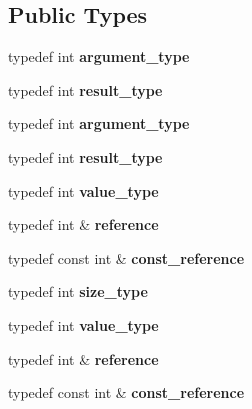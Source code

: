 \subsection*{Public Types}
\begin{DoxyCompactItemize}
\item 
\mbox{\label{struct_c_ae439ca18b80128cfa16466dcf34f3639}} 
typedef int {\bfseries argument\+\_\+type}
\item 
\mbox{\label{struct_c_ac97b3837e6e119e4d9586ec32c739c7b}} 
typedef int {\bfseries result\+\_\+type}
\item 
\mbox{\label{struct_c_ae439ca18b80128cfa16466dcf34f3639}} 
typedef int {\bfseries argument\+\_\+type}
\item 
\mbox{\label{struct_c_ac97b3837e6e119e4d9586ec32c739c7b}} 
typedef int {\bfseries result\+\_\+type}
\item 
\mbox{\label{struct_c_a98485d7f6d9c8bc92172e91ae51b7ce1}} 
typedef int {\bfseries value\+\_\+type}
\item 
\mbox{\label{struct_c_a70a956d99a00871ae514d4db285f6b7d}} 
typedef int \& {\bfseries reference}
\item 
\mbox{\label{struct_c_ac6de935c84e1cec90fc75c87bbec0d1e}} 
typedef const int \& {\bfseries const\+\_\+reference}
\item 
\mbox{\label{struct_c_a0d79b349d947d25a3e91b7b9fb1353f2}} 
typedef int {\bfseries size\+\_\+type}
\item 
\mbox{\label{struct_c_a98485d7f6d9c8bc92172e91ae51b7ce1}} 
typedef int {\bfseries value\+\_\+type}
\item 
\mbox{\label{struct_c_a70a956d99a00871ae514d4db285f6b7d}} 
typedef int \& {\bfseries reference}
\item 
\mbox{\label{struct_c_ac6de935c84e1cec90fc75c87bbec0d1e}} 
typedef const int \& {\bfseries const\+\_\+reference}
\item 
\mbox{\label{struct_c_a0d79b349d947d25a3e91b7b9fb1353f2}} 

\end{DoxyCompactItemize}
